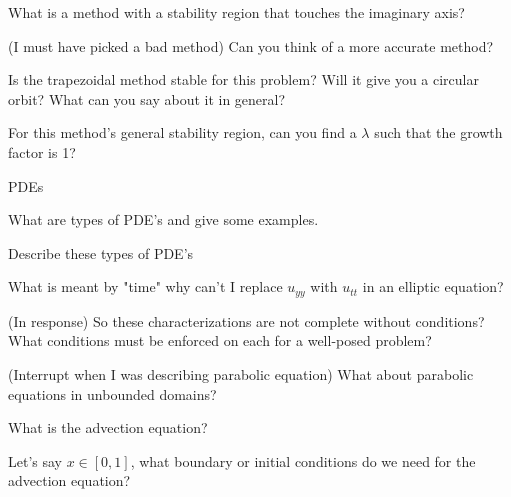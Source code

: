 \documentclass[12pt]{article}
\newenvironment{problem}[2][Problem]{\begin{trivlist}
\item[\hskip \labelsep {\bfseries #1}\hskip \labelsep {\bfseries #2.}]}{\end{trivlist}}
\begin{document}
\begin{problem}{}
What is a method with a stability region that touches the imaginary axis?
\end{problem}

\begin{problem}{}
(I must have picked a bad method) Can you think of a more accurate method?
\end{problem}

\begin{problem}{}
Is the trapezoidal method stable for this problem?  Will it give you a circular orbit?  What can you say about it in general?
\end{problem}

\begin{problem}{}
For this method's general stability region, can you find a $\lambda$ such that the growth factor is 1?
\end{problem}

PDEs

\begin{problem}{}
What are types of PDE's and give some examples.
\end{problem}

\begin{problem}{}
Describe these types of PDE's
\end{problem}

\begin{problem}{}
What is meant by "time" why can't I replace $u_{yy}$ with $u_{tt}$ in an elliptic equation?
\end{problem}

\begin{problem}{}
(In response) So these characterizations are not complete without conditions?  What conditions must be enforced on each for a well-posed problem?
\end{problem}

\begin{problem}{}
(Interrupt when I was describing parabolic equation) What about parabolic equations in unbounded domains?
\end{problem}

\begin{problem}{}
What is the advection equation?
\end{problem}

\begin{problem}{}
Let's say $x\in [0,1]$, what boundary or initial conditions do we need for the advection equation?
\end{problem}
\end{document}
